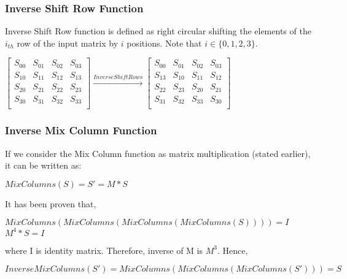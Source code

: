 \documentclass[11pt]{article}
\begin{document}
\subsubsection{Inverse Shift Row Function}
Inverse Shift Row function is defined as right circular shifting the elements of the $i_{th}$ row of the input matrix by $i$ positions. Note that $i \in \{0, 1, 2, 3\}$.
\begin{center}
    $
    \begin{bmatrix}
        S_{00} & S_{01} & S_{02} & S_{03}\\
        S_{10} & S_{11} & S_{12} & S_{13}\\
        S_{20} & S_{21} & S_{22} & S_{23}\\
        S_{30} & S_{31} & S_{32} & S_{33}\\
    \end{bmatrix}
    \xrightarrow{Inverse Shift Rows}
    \begin{bmatrix}
        S_{00} & S_{01} & S_{02} & S_{03}\\
        S_{13} & S_{10} & S_{11} & S_{12}\\
        S_{22} & S_{23} & S_{20} & S_{21}\\
        S_{31} & S_{32} & S_{33} & S_{30}\\
    \end{bmatrix}
    $
\end{center}

\subsubsection{Inverse Mix Column Function}
If we consider the Mix Column function as matrix multiplication (stated earlier), it can be written as:
\begin{center}
    $MixColumns(S) = S' = M * S$
\end{center}
It has been proven that,
\begin{center}
    $MixColumns(MixColumns(MixColumns(MixColumns(S)))) = I$\\
    \vspace{1mm}
    $M^4 * S = I$
\end{center}
where I is identity matrix. Therefore, inverse of M is $M^3$. Hence, 
\begin{center}
    $InverseMixColumns(S') = MixColumns(MixColumns(MixColumns(S'))) = S$
\end{center}
\end{document}
